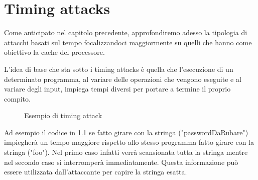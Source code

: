 \chapter{Timing attacks}
	Come anticipato nel capitolo precedente, approfondiremo adesso la tipologia di attacchi basati sul tempo focalizzandoci maggiormente su quelli che hanno come obiettivo la cache del processore. 
	
	L'idea di base che sta sotto i timing attacks è quella che l'esecuzione di un determinato programma, al variare delle operazioni che vengono eseguite e al variare degli input, impiega tempi diversi per portare a termine il proprio compito.
	
	\begin{figure}
		\begin{center}
			
			\caption{Esempio di timing attack}
			\label{fig:timingBase}
		\end{center}
	\end{figure}
	
	Ad esempio il codice in \cref{fig:timingBase} se fatto girare con la stringa ("passwordDaRubare") impiegherà un tempo maggiore rispetto allo stesso programma fatto girare con la stringa ("foo"). Nel primo caso infatti verrà scansionata tutta la stringa mentre nel secondo caso si interromperà immediatamente. Questa informazione può essere utilizzata dall'attaccante per capire la stringa esatta.